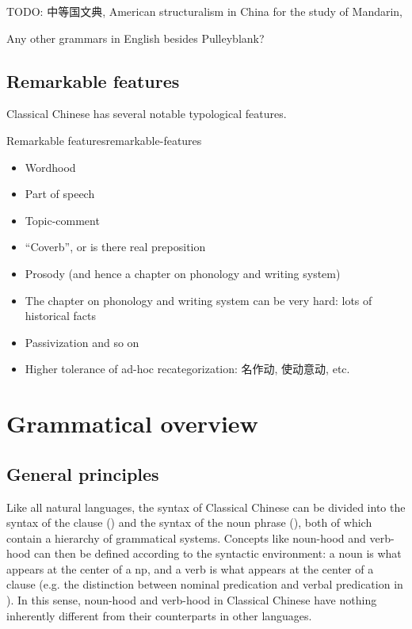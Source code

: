 \documentclass[UTF8, a4paper, oneside, scheme=plain, 12pt]{ctexrep}
\begin{document}
TODO: 中等国文典, American structuralism in China for the study of Mandarin,

Any other grammars in English besides Pulleyblank?



\section{Remarkable features}

Classical Chinese has several notable typological features.

\begin{todobox}{Remarkable features}{remarkable-features}
    \begin{itemize}
        \item Wordhood
        \item Part of speech
        \item Topic-comment
        \item ``Coverb'', or is there real preposition
        \item Prosody (and hence a chapter on phonology and writing system)
        \item The chapter on phonology and writing system can be very hard:
            lots of historical facts
        \item Passivization and so on
        \item Higher tolerance of ad-hoc recategorization: 名作动, 使动意动, etc.
    \end{itemize}
\end{todobox}


\chapter{Grammatical overview}\label{chap:grammatical}

\section{General principles}\label{sec:grammatical.intro}

Like all natural languages, the syntax of Classical Chinese can be divided into 
the syntax of the clause () and the syntax of the noun phrase (),
both of which contain a hierarchy of grammatical systems.
Concepts like noun-hood and verb-hood can then be defined according to the syntactic environment:
a noun is what appears at the center of a \ac{np},
and a verb is what appears at the center of a clause
(e.g. the distinction between nominal predication and verbal predication 
in ).
In this sense, noun-hood and verb-hood in Classical Chinese have nothing inherently different from their counterparts in other languages.
\end{document}
